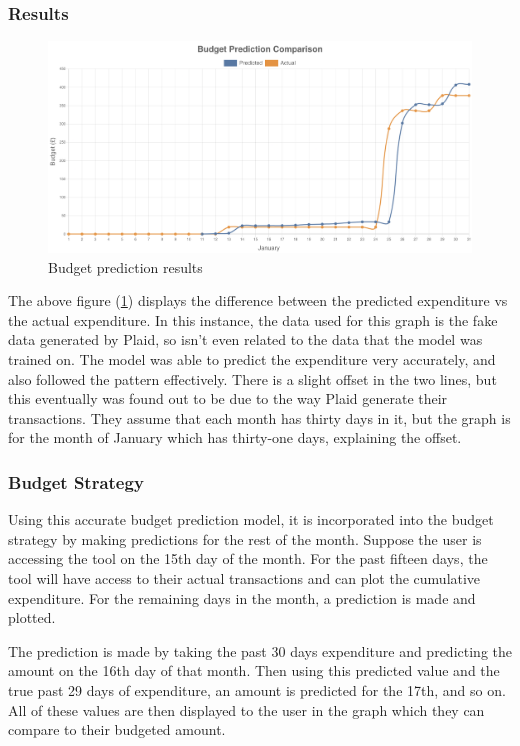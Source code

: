 \subsubsection{Results}
\begin{figure}[H]
	\centering
	\includegraphics[width=\textwidth]{images/Budger_prediction_comparison.png}
	\caption{Budget prediction results}
	\label{fig:BudgetPredictionResults}
\end{figure}

The above figure (\ref{fig:BudgetPredictionResults}) displays the difference between the predicted expenditure vs the actual expenditure. In this instance, the data used for this graph is the fake data generated by Plaid, so isn't even related to the data that the model was trained on. The model was able to predict the expenditure very accurately, and also followed the pattern effectively. There is a slight offset in the two lines, but this eventually was found out to be due to the way Plaid generate their transactions. They assume that each month has thirty days in it, but the graph is for the month of January which has thirty-one days, explaining the offset.

\subsubsection{Budget Strategy}
Using this accurate budget prediction model, it is incorporated into the budget strategy by making predictions for the rest of the month. Suppose the user is accessing the tool on the 15th day of the month. For the past fifteen days, the tool will have access to their actual transactions and can plot the cumulative expenditure. For the remaining days in the month, a prediction is made and plotted.

The prediction is made by taking the past 30 days expenditure and predicting the amount on the 16th day of that month. Then using this predicted value and the true past 29 days of expenditure, an amount is predicted for the 17th, and so on. All of these values are then displayed to the user in the graph which they can compare to their budgeted amount.

